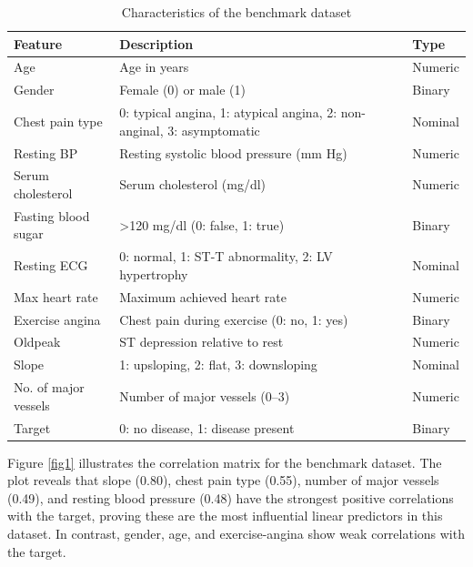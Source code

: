 \documentclass[twoside]{article}
\begin{document}
\begin{table}[]
	\centering
	\label{tbl1}
	\caption{Characteristics of the benchmark dataset}
	\begin{tabular}{lll}
		\hline
		Feature              & Description                                                            & Type    \\ \hline
		Age                  & Age in years                                                           & Numeric \\
		Gender               & Female (0) or male (1)                                                 & Binary  \\
		Chest pain type      & 0: typical angina, 1: atypical angina, 2: non-anginal, 3: asymptomatic & Nominal \\
		Resting BP           & Resting systolic blood pressure (mm Hg)                                & Numeric \\
		Serum cholesterol    & Serum cholesterol (mg/dl)                                              & Numeric \\
		Fasting blood sugar  & \textgreater 120 mg/dl (0: false, 1: true)                             & Binary  \\
		Resting ECG          & 0: normal, 1: ST-T abnormality, 2: LV hypertrophy                      & Nominal \\
		Max heart rate       & Maximum achieved heart rate                                            & Numeric \\
		Exercise angina      & Chest pain during exercise (0: no, 1: yes)                             & Binary  \\
		Oldpeak              & ST depression relative to rest                                         & Numeric \\
		Slope                & 1: upsloping, 2: flat, 3: downsloping                                  & Nominal \\
		No. of major vessels & Number of major vessels (0–3)                                          & Numeric \\
		Target               & 0: no disease, 1: disease present                                      & Binary  \\ \hline
	\end{tabular}
\end{table}

Figure \ref{fig1} illustrates the correlation matrix for the benchmark dataset. The plot reveals that slope (0.80), chest pain type (0.55), number of major vessels (0.49), and resting blood pressure (0.48) have the strongest positive correlations with the target, proving these are the most influential linear predictors in this dataset. In contrast, gender, age, and exercise-angina show weak correlations with the target.
\end{document}
